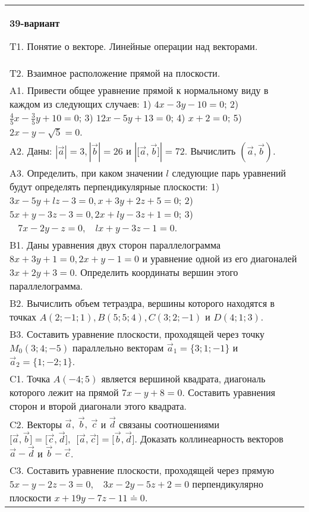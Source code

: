 \documentclass{article}
\begin{document}
\begin{tabular}{m{17cm}}
\textbf{39-вариант}
\newline

T1. 
Понятие о векторе. Линейные операции над векторами.
 \\
T2. 
Взаимное расположение прямой на плоскости.
 \\
A1. 
Привести общее уравнение прямой к нормальному виду в каждом из следующих случаев: 1) \(4x - 3y - 10 = 0\); 2) \(\frac{4}{5}x - \frac{3}{5}y + 10 = 0\); 3) \(12x - 5y + 13 = 0\); 4) \(x + 2 = 0\); 5) \(2x - y - \sqrt{5} = 0\).
 \\
A2. 
Даны: \(|\overrightarrow{a}| = 3,|\overrightarrow{b}| = 26\) и \(|\lbrack\overrightarrow{a},\overrightarrow{b}\rbrack| = 72\). Вычислить \(\left( \overrightarrow{a},\overrightarrow{b} \right)\).
 \\
A3. 
Определить, при каком значении \(l\) следующие парь уравнений будут определять перпендикулярные плоскости: 1) \(3x - 5y + lz - 3 = 0,x + 3y + 2z + 5 = 0\); 2) \(5x + y - 3z - 3 = 0,2x + ly - 3z + 1 = 0\); 3) \(\ \ \ \ 7x - 2y - z = 0,\ \ \ \ lx + y - 3z - 1 = 0\).
 \\
B1. 
Даны уравнения двух сторон параллелограмма \(8x + 3y + 1 = 0,2x + y - 1 = 0\) и уравнение одной из его диагоналей \(3x + 2y + 3 = 0\). Определить координаты вершин этого параллелограмма.
 \\
B2. 
Вычислить объем тетраэдра, вершины которого находятся в точках \(A(2; - 1;1),B(5;5;4),C(3;2; - 1)\) и \(D(4;1;3)\).
 \\
B3. Составить уравнение плоскости, проходящей через точку \(M_{0}(3;4; - 5)\) параллельно векторам \({\overrightarrow{a}}_{1} = \{ 3;1; - 1\}\) и \({\overrightarrow{a}}_{2} = \{ 1; - 2;1\}\).
 \\
C1. 
Точка \(A( - 4;5)\) является вершиной квадрата, диагональ которого лежит на прямой \(7x - y + 8 = 0\). Составить уравнения сторон и второй диагонали этого квадрата.
 \\
C2. 
Векторы \(\overrightarrow{a},\ \overrightarrow{b},\ \overrightarrow{c}\) и \(\overrightarrow{d}\) связаны соотношениями \(\lbrack\overrightarrow{a},\overrightarrow{b}\rbrack = \lbrack\overrightarrow{c},\overrightarrow{d}\rbrack,\ \ \lbrack\overrightarrow{a},\overrightarrow{c}\rbrack = \lbrack\overrightarrow{b},\overrightarrow{d}\rbrack\). Доказать коллинеарность векторов \(\overrightarrow{a} - \overrightarrow{d}\) и \(\overrightarrow{b} - \overrightarrow{c}\).
 \\
C3. 
Составить уравнение плоскости, проходящей через прямую \(5x - y - 2z - 3 = 0,\ \ \ \ 3x - 2y - 5z + 2 = 0\) перпендикулярно плоскости \(x + 19y - 7z - 11 \doteq 0\).
 \\

\end{tabular}
\vspace{1cm}
\end{document}
